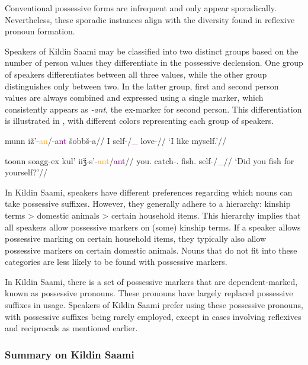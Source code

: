     Conventional possessive forms are infrequent and only appear sporadically. Nevertheless, these sporadic instances align with the diversity found in reflexive pronoun formation.

    Speakers of Kildin Saami may be classified into two distinct groups based on the number of person values they differentiate in the possessive declension. One group of speakers differentiates between all three values, while the other group distinguishes only between two. In the latter group, first and second person values are always combined and expressed using a single marker, which consistently appears as \textit{-ant}, the ex-marker for second person. This differentiation is illustrated in , with different colors representing each group of speakers.

    \pex\label{two_types}
    \a\begingl
    \gla munn iž'-\textcolor{orange}{an}/-\textcolor{purple}{ant} šobbš-a//
    \glb I self-\textcolor{orange}{\Poss{}\First}/\textcolor{purple}{\Poss{}\First\_\Second{}} love-\Npst{}\Fsg//
    \glft `I like myself.'//
    \endgl

    \a\begingl
    \gla toonn	soagg-ex	kul'	iiǯ-s'-\textcolor{orange}{ant}/\textcolor{purple}{ant}//
    \glb you.\Sg{} catch-\Pst.\Ssg{} fish.\Acc{} self-\textcolor{orange}{\Poss{}\Second{}}/\textcolor{purple}{\Poss{}\First\_\Second{}}//
    \glft `Did you fish for yourself?'//
    \endgl

    \xe

In Kildin Saami, speakers have different preferences regarding which nouns can take possessive suffixes. However, they generally adhere to a hierarchy: kinship terms > domestic animals > certain household items. This hierarchy implies that all speakers allow possessive markers on (some) kinship terms. If a speaker allows possessive marking on certain household items, they typically also allow possessive markers on certain domestic animals. Nouns that do not fit into these categories are less likely to be found with possessive markers.

In Kildin Saami, there is a set of possessive markers that are dependent-marked, known as possessive pronouns. These pronouns have largely replaced possessive suffixes in usage. Speakers of Kildin Saami prefer using these possessive pronouns, with possessive suffixes being rarely employed, except in cases involving reflexives and reciprocals as mentioned earlier.

\subsubsection*{Summary on Kildin Saami}


